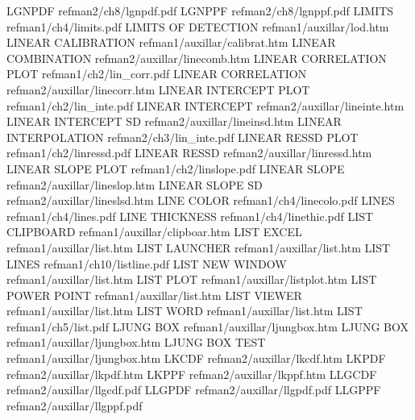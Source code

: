 LGNPDF                                  refman2/ch8/lgnpdf.pdf
LGNPPF                                  refman2/ch8/lgnppf.pdf
LIMITS                                  refman1/ch4/limits.pdf
LIMITS OF DETECTION                     refman1/auxillar/lod.htm
LINEAR CALIBRATION                      refman1/auxillar/calibrat.htm
LINEAR COMBINATION                      refman2/auxillar/linecomb.htm
LINEAR CORRELATION PLOT                 refman1/ch2/lin_corr.pdf
LINEAR CORRELATION                      refman2/auxillar/linecorr.htm
LINEAR INTERCEPT PLOT                   refman1/ch2/lin_inte.pdf
LINEAR INTERCEPT                        refman2/auxillar/lineinte.htm
LINEAR INTERCEPT SD                     refman2/auxillar/lineinsd.htm
LINEAR INTERPOLATION                    refman2/ch3/lin_inte.pdf
LINEAR RESSD PLOT                       refman1/ch2/linressd.pdf
LINEAR RESSD                            refman2/auxillar/linressd.htm
LINEAR SLOPE PLOT                       refman1/ch2/linslope.pdf
LINEAR SLOPE                            refman2/auxillar/lineslop.htm
LINEAR SLOPE SD                         refman2/auxillar/lineslsd.htm
LINE COLOR                              refman1/ch4/linecolo.pdf
LINES                                   refman1/ch4/lines.pdf
LINE THICKNESS                          refman1/ch4/linethic.pdf
LIST CLIPBOARD                          refman1/auxillar/clipboar.htm
LIST EXCEL                              refman1/auxillar/list.htm
LIST LAUNCHER                           refman1/auxillar/list.htm
LIST LINES                              refman1/ch10/listline.pdf
LIST NEW WINDOW                         refman1/auxillar/list.htm
LIST PLOT                               refman1/auxillar/listplot.htm
LIST POWER POINT                        refman1/auxillar/list.htm
LIST VIEWER                             refman1/auxillar/list.htm
LIST WORD                               refman1/auxillar/list.htm
LIST                                    refman1/ch5/list.pdf
LJUNG BOX                               refman1/auxillar/ljungbox.htm
LJUNG BOX                               refman1/auxillar/ljungbox.htm
LJUNG BOX TEST                          refman1/auxillar/ljungbox.htm
LKCDF                                   refman2/auxillar/lkcdf.htm
LKPDF                                   refman2/auxillar/lkpdf.htm
LKPPF                                   refman2/auxillar/lkppf.htm
LLGCDF                                  refman2/auxillar/llgcdf.pdf
LLGPDF                                  refman2/auxillar/llgpdf.pdf
LLGPPF                                  refman2/auxillar/llgppf.pdf

